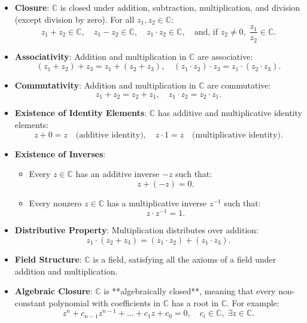 \begin{itemize}
    \item \textbf{Closure}: \( \mathbb{C} \) is closed under addition, subtraction, multiplication, and division (except division by zero). For all \( z_1, z_2 \in \mathbb{C} \):
    \[
    z_1 + z_2 \in \mathbb{C}, \quad z_1 - z_2 \in \mathbb{C}, \quad z_1 \cdot z_2 \in \mathbb{C}, \quad \text{and, if } z_2 \neq 0, \; \frac{z_1}{z_2} \in \mathbb{C}.
    \]

    \item \textbf{Associativity}: Addition and multiplication in \( \mathbb{C} \) are associative:
    \[
    (z_1 + z_2) + z_3 = z_1 + (z_2 + z_3), \quad (z_1 \cdot z_2) \cdot z_3 = z_1 \cdot (z_2 \cdot z_3).
    \]

    \item \textbf{Commutativity}: Addition and multiplication in \( \mathbb{C} \) are commutative:
    \[
    z_1 + z_2 = z_2 + z_1, \quad z_1 \cdot z_2 = z_2 \cdot z_1.
    \]

    \item \textbf{Existence of Identity Elements}: \( \mathbb{C} \) has additive and multiplicative identity elements:
    \[
    z + 0 = z \quad \text{(additive identity)}, \quad z \cdot 1 = z \quad \text{(multiplicative identity)}.
    \]

    \item \textbf{Existence of Inverses}:
    \begin{itemize}
        \item Every \( z \in \mathbb{C} \) has an additive inverse \( -z \) such that:
        \[
        z + (-z) = 0.
        \]
        \item Every nonzero \( z \in \mathbb{C} \) has a multiplicative inverse \( z^{-1} \) such that:
        \[
        z \cdot z^{-1} = 1.
        \]
    \end{itemize}

    \item \textbf{Distributive Property}: Multiplication distributes over addition:
    \[
    z_1 \cdot (z_2 + z_3) = (z_1 \cdot z_2) + (z_1 \cdot z_3).
    \]

\vspace{\baselineskip}\par
    \item \textbf{Field Structure}: \( \mathbb{C} \) is a field, satisfying all the axioms of a field under addition and multiplication.

    \item \textbf{Algebraic Closure}: \( \mathbb{C} \) is **algebraically closed**, meaning that every non-constant polynomial with coefficients in \( \mathbb{C} \) has a root in \( \mathbb{C} \). For example:
    \[
    z^n + c_{n-1}z^{n-1} + \dots + c_1z + c_0 = 0, \quad c_i \in \mathbb{C}, \; \exists z \in \mathbb{C}.
    \]


\end{itemize}
